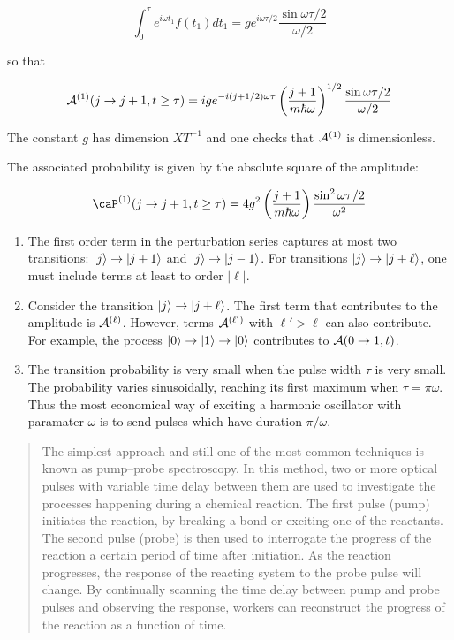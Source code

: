 \begin{equation}
\int_0^\tau e^{i\omega t_1}f(t_1) dt_1 = ge^{i\omega \tau/2}\frac{ \sin \omega \tau/2}{\omega/2}
\end{equation}

so that

\begin{equation}
\mathcal{A}^{(1)}(j \to j+1, t\ge \tau) = 
ig e^{-i(j+  1/2)\omega\tau}  \left(\frac{j+1}{m\hbar \omega}\right)^{1/2}\frac{ \sin \omega \tau/2}{\omega/2}
\end{equation}

\begin{remark}
The constant $g$ has dimension $XT^{-1}$ and one checks that $\mathcal{A}^{(1)}$ is dimensionless.
\end{remark}

The associated probability is given by the absolute square of the amplitude:

\begin{equation}
\caP^{(1)}(j \to j+1, t\ge \tau) = 
4g^2  \left(\frac{j+1}{m\hbar \omega}\right)\frac{ \sin^2 \omega \tau/2}{\omega^2}
\end{equation}



\begin{enumerate}
\item The first order term in the perturbation series captures at most two transitions: $| j \rangle \to | j + 1 \rangle$ and  $| j \rangle \to | j- 1 \rangle$.  For transitions $| j \rangle \to | j + \ell \rangle$, one must include terms at least to order $|\ell|$.
%
\item Consider the transition  $| j \rangle \to | j + \ell \rangle$.  The first term that contributes to the amplitude is $\mathcal{A}^{(\ell)}$.  However, terms $\mathcal{A}^{(\ell')}$ with $\ell' > \ell$ can also contribute.  For example, the process $|0\rangle \to |1\rangle \to|0\rangle$ contributes to $\mathcal{A}(0 \to 1, t)$.
\item The transition probability is very small when the pulse width $\tau$ is very small.  The probability varies sinusoidally, reaching its first maximum when $\tau = \pi\omega$.  Thus the most economical way of exciting a harmonic oscillator with paramater $\omega$ is to send pulses which have duration $\pi/\omega$.
\end{enumerate}



\begin{quote}
The simplest approach and still one of the most common techniques is known as pump–probe spectroscopy. In this method, two or more optical pulses with variable time delay between them are used to investigate the processes happening during a chemical reaction. The first pulse (pump) initiates the reaction, by breaking a bond or exciting one of the reactants. The second pulse (probe) is then used to interrogate the progress of the reaction a certain period of time after initiation. As the reaction progresses, the response of the reacting system to the probe pulse will change. By continually scanning the time delay between pump and probe pulses and observing the response, workers can reconstruct the progress of the reaction as a function of time.
\end{quote}


